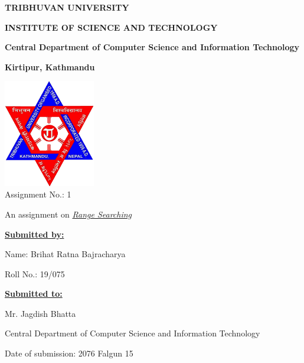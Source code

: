 \documentclass[a4paper,12pt]{article}
\begin{document}
  \thispagestyle{empty}
  \begin{center}
    \hfill \break

    \begin{Large}
      \textbf{TRIBHUVAN UNIVERSITY}
    \end{Large}

    \begin{large}
      \textbf{INSTITUTE OF SCIENCE AND TECHNOLOGY}
    \end{large}

    \begin{normalsize}
      \textbf{Central Department of Computer Science and Information Technology}
    \end{normalsize}

    \begin{footnotesize}
      \textbf{Kirtipur, Kathmandu}\\[3cm]
    \end{footnotesize}

    \includegraphics[width=4cm]{tu_logo.png}\\[3cm]

  Assignment No.: 1

  An assignment on \emph{\underline{Range Searching}}\\[3cm]

    \begin{flushleft}
      \begin{multicols}{2}
        \textbf{\underline{Submitted by:}}

        Name: Brihat Ratna Bajracharya

        Roll No.: 19/075

        \hfill \break

        \textbf{\underline{Submitted to:}}

        Mr. Jagdish Bhatta

        Central Department of Computer Science and Information Technology

      \end{multicols}
    \end{flushleft}

    \hfill \break

    Date of submission: 2076 Falgun 15
  \end{center}

  \pagebreak
\end{document}
